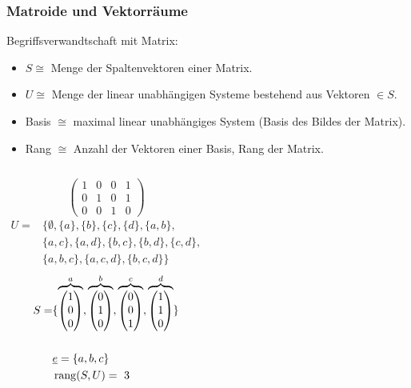\begin{frame}
\frametitle{Matroide und Vektorräume}

 {
				Begriffsverwandtschaft mit Matrix:
				\begin{itemize}
					\item<2-> 	$S \cong$ Menge der Spaltenvektoren einer Matrix.
					\item<3-> 	$U \cong$ Menge der linear unabhängigen Systeme bestehend aus Vektoren $\in S$.
					\item<4-> 	Basis $\cong$ maximal linear unabhängiges System (Basis des Bildes der Matrix).
					\item<5->	Rang $\cong$ Anzahl der Vektoren einer Basis, Rang der Matrix.
				\end{itemize}
}

 {
	\begin{columns}
			$$ \begin{pmatrix}
				1 & 0 & 0 & 1 \\ 0  & 1 & 0 & 1   \\ 0 & 0 & 1 & 0 
			\end{pmatrix}$$
			\begin{align*}
				U  = &  \{ \emptyset, \{a\}, \{b\}, \{c\}, \{d\}, \{a,b\},\\
				 &  \{a,c\}, \{a,d\}, \{b,c\}, \{b,d\}, \{c,d\}, \\
				 &  \{a,b,c\}, \{a,c,d\}, \{b,c,d\} \} 
			\end{align*}
			\begin{align*}
				 S  = &  \{ \overbrace{\begin{pmatrix} 1 \\ 0 \\ 0 \end{pmatrix}}^{a}, \overbrace{\begin{pmatrix} 0\\1\\0 \end{pmatrix}}^{b}, \overbrace{\begin{pmatrix} 0\\0\\1 \end{pmatrix}}^{c}, \overbrace{\begin{pmatrix} 1\\1\\0 \end{pmatrix} }^{d} \}\\
				 \hfill \\
				 & \underline{e} = \{a,b,c\} \\
				 & \operatorname{rang}(S,U) =  \ 3 
			\end{align*}
	\end{columns}
}

\end{frame}